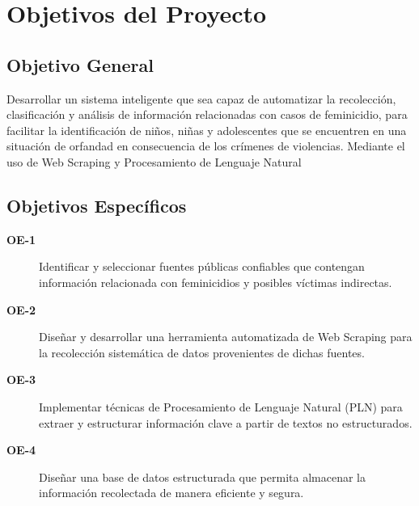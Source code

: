 \section*{Objetivos del Proyecto}
\label{sec:objetivos}


\subsection*{Objetivo General}
\label{subsec:objetivo_general}

Desarrollar un sistema inteligente que sea capaz de automatizar la recolección, clasificación y análisis de 
información relacionadas con casos de feminicidio, para facilitar la identificación de niños, niñas y adolescentes 
que se encuentren en una situación de orfandad en consecuencia de los crímenes de violencias. Mediante el uso 
de Web Scraping y Procesamiento de Lenguaje Natural

\subsection*{Objetivos Específicos}
\label{subsec:objetivos_especificos}

\begin{description}
    \item[\textbf{OE-1}]
          Identificar y seleccionar fuentes públicas confiables que contengan información relacionada con feminicidios y posibles víctimas indirectas.

    \item[\textbf{OE-2}]
          Diseñar y desarrollar una herramienta automatizada de Web Scraping para la recolección sistemática de datos provenientes de dichas fuentes.

    \item[\textbf{OE-3} ]
          Implementar técnicas de Procesamiento de Lenguaje Natural (PLN) para extraer y estructurar información clave a partir de textos no estructurados.

    \item[\textbf{OE-4}]
          Diseñar una base de datos estructurada que permita almacenar la información recolectada de manera eficiente y segura.

\end{description}

